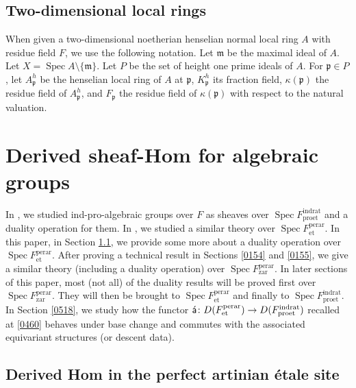 \documentclass{amsart}
\theoremstyle{remark}
\numberwithin{equation}{subsection}
\newcommand{\et}{\mathrm{et}}
\newcommand{\zar}{\mathrm{zar}}
\newcommand{\rat}{\mathrm{rat}}
\newcommand{\ind}{\mathrm{ind}}
\newcommand{\pro}{\mathrm{pro}}
\newcommand{\perar}{\mathrm{perar}}
\newcommand{\ideal}[1]{\mathfrak{#1}}
\newcommand{\algebrize}{\Acute{\mathsf{a}}}
\DeclareMathOperator{\Spec}{Spec}
\begin{document}

\subsection{Two-dimensional local rings}
\label{0463}

When given a two-dimensional noetherian henselian normal local ring $A$ with residue field $F$,
we use the following notation.
Let $\ideal{m}$ be the maximal ideal of $A$.
Let $X = \Spec A \setminus \{\ideal{m}\}$.
Let $P$ be the set of height one prime ideals of $A$.
For $\ideal{p} \in P$,
let $A_{\ideal{p}}^{h}$ be the henselian local ring of $A$ at $\ideal{p}$,
$K_{\ideal{p}}^{h}$ its fraction field,
$\kappa(\ideal{p})$ the residue field of $A_{\ideal{p}}^{h}$,
and $F_{\ideal{p}}$ the residue field of $\kappa(\ideal{p})$ with respect to the natural valuation.


\section{Derived sheaf-Hom for algebraic groups}
\label{0133}

In \cite[\S 2]{Suz20}, we studied ind-pro-algebraic groups over $F$
as sheaves over $\Spec F^{\ind\rat}_{\pro\et}$
and a duality operation for them.
In \cite{Suz21}, we studied a similar theory over $\Spec F^{\perar}_{\et}$.
In this paper, in Section \ref{0309},
we provide some more about a duality operation over $\Spec F^{\perar}_{\et}$.
After proving a technical result in Sections \ref{0154} and \ref{0155},
we give a similar theory (including a duality operation) over $\Spec F^{\perar}_{\zar}$.
In later sections of this paper, most (not all) of the duality results will be proved
first over $\Spec F^{\perar}_{\zar}$.
They will then be brought to $\Spec F^{\perar}_{\et}$
and finally to $\Spec F^{\ind\rat}_{\pro\et}$.
In Section \ref{0518},
we study how the functor
$\algebrize \colon D(F^{\perar}_{\et}) \to D(F^{\ind\rat}_{\pro\et})$
recalled at \eqref{0460} behaves under base change
and commutes with the associated equivariant structures (or descent data).


\subsection{Derived Hom in the perfect artinian \'etale site}
\label{0309}
\end{document}
